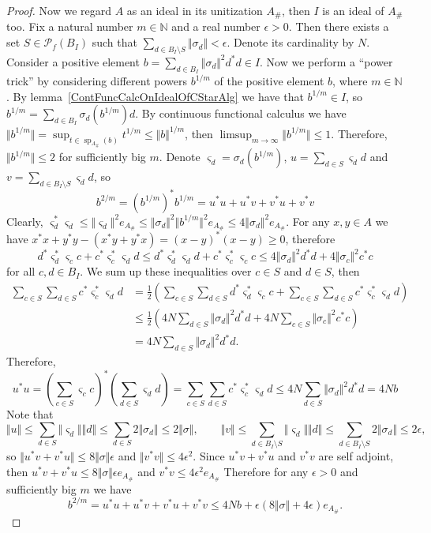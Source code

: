\begin{proof}
Now we regard $A$ as an ideal in its unitization $A_\#$, then $I$ is an ideal of
$A_\#$ too. Fix a natural number $m\in\mathbb{N}$ and a real number
$\epsilon>0$. Then there exists a set $S\in\mathcal{P}_{f}(B_I)$ such that
$\sum_{d\in B_I\setminus S}\Vert\sigma_d\Vert<\epsilon$. Denote its cardinality
by $N$. Consider a positive element 
$b=\sum_{d\in B_I}\Vert\sigma_d\Vert^2 d^*d\in I$. Now we perform 
a ``power trick'' by considering different powers $b^{1/m}$ of the positive element 
$b$, where $m\in\mathbb{N}$. By lemma~\ref{ContFuncCalcOnIdealOfCStarAlg} we 
have that $b^{1/m}\in I$, so $b^{1/m}=\sum_{d\in B_I}\sigma_d(b^{1/m})d$. 
By continuous functional calculus we have 
$\Vert b^{1/m}\Vert
=\sup_{t\in\operatorname{sp}_{A_\#}(b)} t^{1/m}\leq\Vert b\Vert^{1/m}$, 
then $\limsup_{m\to\infty}\Vert b^{1/m}\Vert\leq 1$. 
Therefore, $\Vert b^{1/m}\Vert\leq 2$ for sufficiently big $m$. Denote
$\varsigma_d=\sigma_d(b^{1/m})$, $u=\sum_{d\in S}\varsigma_d d$ and
$v=\sum_{d\in B_I\setminus S}\varsigma_d d$, so 
$$
b^{2/m}={(b^{1/m})}^*b^{1/m}=u^*u+u^*v+v^*u+v^*v
$$
Clearly, $\varsigma_d^*\varsigma_d\leq \Vert \varsigma_d\Vert^2 e_{A_\#}\leq
\Vert \sigma_d\Vert^2\Vert b^{1/m}\Vert^2 e_{A_\#}\leq 4\Vert \sigma_d\Vert^2
e_{A_\#}$. For any $x,y\in A$ we have $x^*x+y^*y-(x^*y+y^*x)={(x-y)}^*(x-y)\geq
0$, therefore 
$$
d^*\varsigma_d^* \varsigma_c c+c^*\varsigma_c^* \varsigma_d d
\leq d^*\varsigma_d^*\varsigma_d d + c^*\varsigma_c^*\varsigma_c c
\leq 4\Vert \sigma_d\Vert^2 d^*d+4\Vert \sigma_c\Vert^2 c^*c
$$
for all $c,d\in B_I$. We sum up these inequalities over $c\in S$ and $d\in S$,
then 
$$
\begin{aligned}
\sum_{c\in S}\sum_{d\in S}c^*\varsigma_c^* \varsigma_d d
&=\frac{1}{2}\left(
    \sum_{c\in S}\sum_{d\in S}d^*\varsigma_d^* \varsigma_c c
    +
    \sum_{c\in S}\sum_{d\in S}c^*\varsigma_c^* \varsigma_d d
\right)\\
&\leq\frac{1}{2}\left(4 N\sum_{d\in S} \Vert \sigma_d\Vert^2 d^*d+
4 N\sum_{c\in S} \Vert \sigma_c\Vert^2 c^*c\right)\\
&=4 N\sum_{d\in S} \Vert \sigma_d\Vert^2 d^*d.
\end{aligned}
$$
Therefore,
$$
u^*u
={\left(\sum_{c\in S}\varsigma_c c\right)}^*
\left(\sum_{d\in S}\varsigma_d d\right)
=\sum_{c\in S}\sum_{d\in S}c^*\varsigma_c^* \varsigma_d d
\leq 4N\sum_{d\in S} \Vert \sigma_d\Vert^2 d^*d
= 4N b
$$
Note that
$$
\Vert u\Vert
\leq \sum_{d\in S}\Vert\varsigma_d\Vert\Vert d\Vert
\leq \sum_{d\in S}2\Vert\sigma_d\Vert
\leq 2\Vert\sigma\Vert,
\qquad
\Vert v\Vert
\leq \sum_{d\in B_I\setminus S}\Vert\varsigma_d\Vert\Vert d\Vert
\leq \sum_{d\in B_I\setminus S}2\Vert\sigma_d\Vert
\leq 2\epsilon,
$$
so $\Vert u^*v+v^*u\Vert\leq 8\Vert\sigma\Vert\epsilon$ 
and $\Vert v^*v\Vert\leq 4\epsilon^2$. Since $u^*v+v^*u$ and $v^*v$ are self 
adjoint, then $u^*v+v^*u\leq 8\Vert\sigma\Vert\epsilon e_{A_\#}$ 
and $v^*v\leq 4\epsilon^2 e_{A_\#}$ Therefore for any $\epsilon>0$ and 
sufficiently big $m$ we have 
$$
b^{2/m}
=u^*u+u^*v+v^*u+v^*v
\leq 4Nb+\epsilon(8\Vert\sigma\Vert+4\epsilon)e_{A_\#}.
$$



\end{proof}
